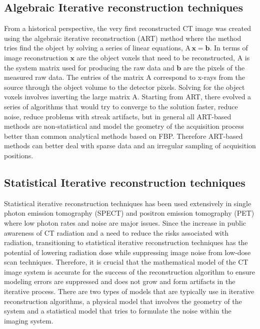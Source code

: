 \subsection{Algebraic Iterative reconstruction techniques}
From a historical perspective, the very first reconstructed CT image was created using the algebraic iterative reconstruction (ART) method where the method tries find the object by solving a series of linear equations, $\mathrm{A\,\mathbf{x} = \mathbf{b}}$.  In terms of image reconstruction $\mathrm{\mathbf{x}}$ are the object voxels that need to be reconstructed, $\mathrm{A}$ is the system matrix used for producing the raw data and $\mathrm{\mathbf{b}}$ are the pixels of the measured raw data.  The entries of the matrix $\mathrm{A}$ correspond to x-rays from the source through the object volume to the detector pixels.  Solving for the object voxels involves inverting the large matrix A.  Starting from ART, there evolved a series of algorithms that would try to converge to the solution faster, reduce noise, reduce problems with streak artifacts, but in general all ART-based methods are non-statistical and model the geometry of the acquisition process better than common analytical methods based on FBP.  Therefore ART-based methods can better deal with sparse data and an irregular sampling of acquisition positions\citep{Beister2012}.

\subsection{Statistical Iterative reconstruction techniques}
Statistical iterative reconstruction techniques has been used extensively in single photon emission tomography (SPECT) and positron emission tomography (PET) where low photon rates and noise are major issues.  Since the increase in public awareness of CT radiation and a need to reduce the risks associated with radiation, transitioning to statistical iterative reconstruction techniques has the potential of lowering radiation dose while suppressing image noise from low-dose scan techniques.  Therefore, it is crucial that the mathematical model of the CT image system is accurate for the success of the reconstruction algorithm to ensure modeling errors are suppressed and does not grow and form artifacts in the iterative process.  There are two types of models that are typically use in iterative reconstruction algorithms, a physical model that involves the geometry of the system and a statistical model that tries to formulate the noise within the imaging system.

